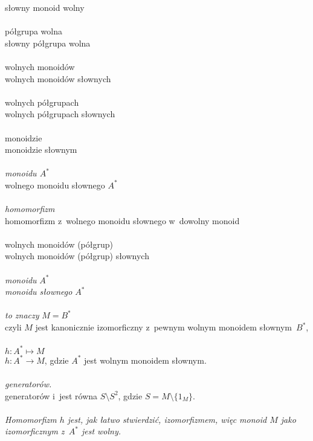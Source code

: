 \documentclass[a4paper,11pt]{article}
\begin{document}
\Powin słowny monoid wolny \\
 \\
\Jest  półgrupa wolna \\
\Powin słowny półgrupa wolna \\
 \\
\Jest  wolnych monoidów \\
\Powin wolnych monoidów słownych \\
 \\
\Jest  wolnych półgrupach \\
\Powin wolnych półgrupach słownych \\
 \\
\Jest  monoidzie \\
\Powin monoidzie słownym \\
 \\
\Jest  \textit{monoidu $A^{ * }$} \\
\Powin wolnego monoidu słownego $A^{ * }$ \\
 \\
\Jest  \textit{homomorfizm} \\
\Powin homomorfizm z~wolnego monoidu słownego w~dowolny monoid \\
 \\
\Jest  wolnych monoidów (półgrup) \\
\Powin wolnych monoidów (półgrup) słownych \\
 \\
\Jest  \textit{monoidu} $A^{ * }$ \\
\Powin \textit{monoidu słownego} $A^{ * }$ \\
 \\
\Jest  \textit{to znaczy} $M = B^{ * }$ \\
\Powin czyli $M$ jest kanonicznie izomorficzny z~pewnym wolnym monoidem
słownym~$B^{ * }$, \\
 \\
\Jest  $h : A^{ * } \mapsto M$ \\
\Powin $h : A^{ * } \to M$, gdzie $A^{ * }$ jest wolnym monoidem słownym. \\
 \\
\Jest  \textit{generatorów.} \\
\Powin generatorów i~jest równa $S \setminus S^{ 2 }$, gdzie
  $S = M \setminus \{ 1_{ M } \}$. \\
 \\
\Jest  \textit{Homomorfizm $h$ jest, jak łatwo stwierdzić, izomorfizmem,
  więc monoid $M$ jako izomorficznym z~$A^{ * }$ jest wolny.} \\
\end{document}
